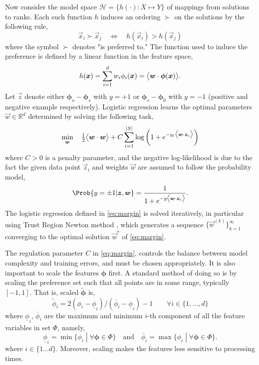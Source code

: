 \documentclass[smallextended]{svjour3}
\renewcommand{\vphi}{\bm \phi}
\begin{document}
	Now consider the model space $\mathcal{H} = \{h(\cdot) : X \mapsto Y\}$ of mappings from solutions to ranks. Each such function $h$ induces an ordering $\succ$ on the solutions  by the following rule,
	\begin{equation}\label{eq:linear}
	\vec{x}_i \succ \vec{x}_j \quad \Leftrightarrow \quad h(\vec{x}_i) > h(\vec{x}_j)
	\end{equation}
	where the symbol $\succ$ denotes "is preferred to."  The function used to induce the preference is defined by a linear function in the feature space,
	\begin{equation}\label{eq:jssp:linweights}
	h(\vec{x})=\sum_{i=1}^d w_i\phi_i(\vec{x})=\inner{\vec{w}}{\vphi(\vec{x})}.
	\end{equation}
	Let $\vec{z}$ denote either $\vphi_o-\vphi_s$ with $y=+1$ or $\vphi_s-\vphi_0$ with $y=-1$ (positive and negative example respectively). Logistic regression learns the optimal parameters $\vec{w}\in\mathbb{R}^d$ determined by solving the following task, 
	\begin{equation}\label{eq:margin}
	\min_{\vec{w}}\quad \tfrac{1}{2}\inner{\vec{w}}{\vec{w}} + C \sum_{i=1}^{\abs{S}} \log\left(1 + e^{-y_i \inner{\vec{w}}{\vec{z}_i}}\right) 
	\end{equation}
	where $C > 0$ is a penalty parameter, and the negative log-likelihood is due to the fact the given data point $\vec{z}_i$ and weights $\vec{w}$ are assumed to follow the probability model,
	\begin{equation}\label{eq:prob}
	\Prob{y=\pm1|\vec{z},\vec{w}}=\frac{1}{1+e^{-y\inner{\vec{w}}{\vec{z}_i}}}.
	\end{equation}
	The logistic regression defined in \cref{eq:margin} is solved iteratively, in particular using Trust Region Newton method \cite{Lin08:newtontrustregion}, which generates a sequence $\{\vec{w}^{(k)}\}_{k=1}^\infty$ converging to the optimal solution $\vec{w}^*$ of \cref{eq:margin}.
	
	The regulation parameter $C$ in \cref{eq:margin}, controls the balance between model complexity and training errors, and must be chosen appropriately. 
	It is also important to scale the features $\vphi$ first. A standard method of doing so is by scaling the preference set such that all points are in some range, typically $[-1,1]$. That is, scaled $\tilde{\vphi}$ is,
	\begin{equation}\label{eq:scale}
	\tilde{\phi}_i = 2 (\phi_i - \underline{\phi}_i) / (\overline{\phi}_i - \underline{\phi}_i) - 1 
	\quad\quad \forall i\in\{1,\ldots,d\}
	\end{equation}
	where $\underline{\phi}_i$, $\overline{\phi}_i$ are the maximum and minimum $i$-th component of all the feature variables in set $\Phi$, namely,
	\begin{equation}
	\underline{\phi}_i=\min\{\phi_i\;|\;\forall\vphi\in \Phi\} \quad\textrm{and}\quad \overline{\phi}_i=\max\{\phi_i\;|\;\forall\vphi\in \Phi\}.
	\end{equation}
	where $i\in\{1\ldots d\}$. Moreover, scaling makes the features less sensitive to processing times. 
	
\end{document}
